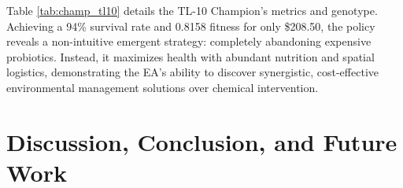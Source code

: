 \documentclass[conference]{IEEEtran}
\begin{document}
Table \ref{tab:champ_tl10} details the TL-10 Champion's metrics and genotype. Achieving a 94\% survival rate and 0.8158 fitness for only \$208.50, the policy reveals a non-intuitive emergent strategy: completely abandoning expensive probiotics. Instead, it maximizes health with abundant nutrition and spatial logistics, demonstrating the EA's ability to discover synergistic, cost-effective environmental management solutions over chemical intervention.

\begin{table}[H]
\centering
\caption{Detailed Metrics and Genotype of the TL-10 Champion}
\label{tab:champ_tl10}
\end{table}

\section{Discussion, Conclusion, and Future Work}
\end{document}
